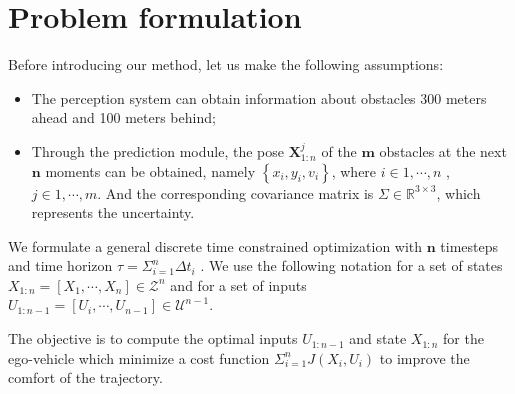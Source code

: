 \documentclass[conference]{IEEEtran}
\begin{document}
\section{ Problem formulation }


Before introducing our method, let us make the following assumptions:
\begin{itemize}
	\item The perception system can obtain information about obstacles 300 meters ahead and 100 meters behind;
	\item Through the prediction module, the pose $ \boldsymbol{X}_{1:n}^{j} $ of the $ \boldsymbol{m} $ obstacles at the next $\boldsymbol{n}$  moments can be obtained, namely $ \left\{ x_i,y_i,v_i \right\} $, where $ i\in 1,\cdots ,n $ , $ j\in 1,\cdots ,m $. And the corresponding covariance matrix is $\boldsymbol {\varSigma} \in \mathbb{R}^{3\times 3}$, which represents the uncertainty.
\end{itemize}




We formulate a general discrete time constrained optimization with  $\boldsymbol{n}$ timesteps and time horizon $
\tau =\varSigma _{i=1}^{n}\varDelta t_i$ . We use the following notation for a set of states $X_{1:n}=\left[ X_1,\cdots ,X_n \right] \in \mathcal{Z}^n$  and for a set of inputs $U_{1:n-1}=\left[ U_i,\cdots ,U_{n-1} \right] \in \mathcal{U}^{n-1}$.

The objective is to compute the optimal inputs $U_{1:n-1}$ and state $X_{1:n}$ for the ego-vehicle which minimize a cost function $\varSigma _{i=1}^{n}J\left( X_i,U_i \right)$ to improve the comfort of the trajectory.
\end{document}
